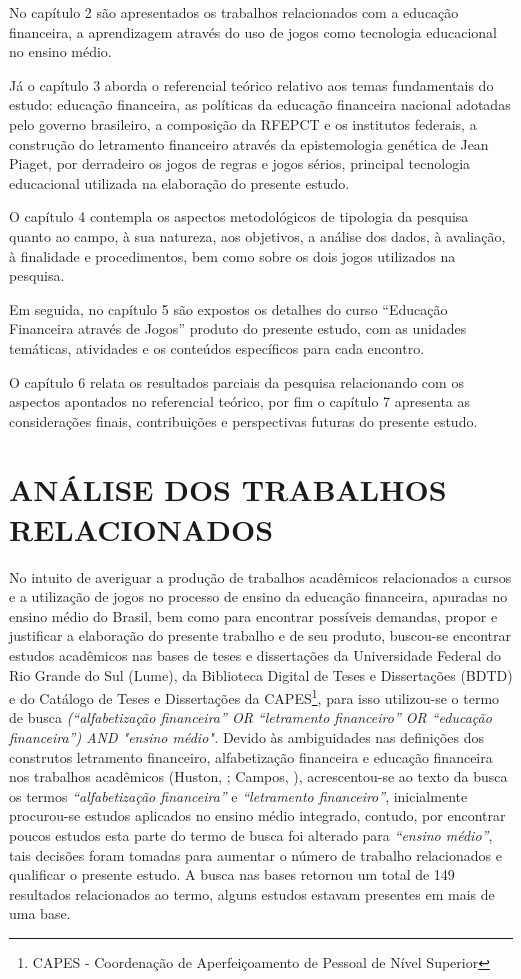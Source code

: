 No capítulo 2 são apresentados os trabalhos relacionados com a educação financeira, a aprendizagem através do uso de jogos como tecnologia educacional no ensino médio.

Já o capítulo 3 aborda o referencial teórico relativo aos temas fundamentais do estudo: educação financeira, as políticas da educação financeira nacional adotadas pelo governo brasileiro, a composição da RFEPCT e os institutos federais, a construção do letramento financeiro através da epistemologia genética de Jean Piaget, por derradeiro os jogos de regras e jogos sérios, principal tecnologia educacional utilizada na elaboração do presente estudo.

O capítulo 4 contempla os aspectos metodológicos de tipologia da pesquisa quanto ao campo, à sua natureza, aos objetivos, a análise dos dados, à avaliação, à finalidade e procedimentos, bem como sobre os dois jogos utilizados na pesquisa.

Em seguida, no capítulo 5 são expostos os detalhes do curso “Educação Financeira através de Jogos” produto do presente estudo, com as unidades temáticas, atividades e os conteúdos específicos para cada encontro.

O capítulo 6 relata os resultados parciais da pesquisa relacionando com os aspectos apontados no referencial teórico, por fim o capítulo 7 apresenta as considerações finais, contribuições e perspectivas futuras do presente estudo.

\chapter{ANÁLISE DOS TRABALHOS RELACIONADOS}
No intuito de averiguar a produção de trabalhos acadêmicos relacionados a cursos e a utilização de jogos no processo de ensino da educação financeira, apuradas no ensino médio do Brasil, bem como para encontrar possíveis demandas, propor e justificar a elaboração do presente trabalho e de seu produto, buscou-se encontrar estudos acadêmicos nas bases de teses e dissertações da Universidade Federal do Rio Grande do Sul (Lume), da Biblioteca Digital de Teses e Dissertações (BDTD) e do Catálogo de Teses e Dissertações da CAPES\footnote{CAPES - Coordenação de Aperfeiçoamento de Pessoal de Nível Superior}, para isso utilizou-se o termo de busca \textit{(“alfabetização financeira” \textit{OR} “letramento financeiro” \textit{OR} “educação financeira”) \textit{AND} "ensino médio".} Devido às ambiguidades nas definições dos construtos letramento financeiro, alfabetização financeira e educação financeira nos trabalhos acadêmicos (Huston, \citeyear{huston2010}; Campos, \citeyear{campos2013}), acrescentou-se ao texto da busca os termos \textit{“alfabetização financeira”} e \textit{“letramento financeiro”}, inicialmente procurou-se estudos aplicados no ensino médio integrado, contudo, por encontrar poucos estudos esta parte do termo de busca foi alterado para \textit{“ensino médio”}, tais decisões foram tomadas para aumentar o número de trabalho relacionados e qualificar o presente estudo. A busca nas bases retornou um total de 149 resultados relacionados ao termo, alguns estudos estavam presentes em mais de uma base.

